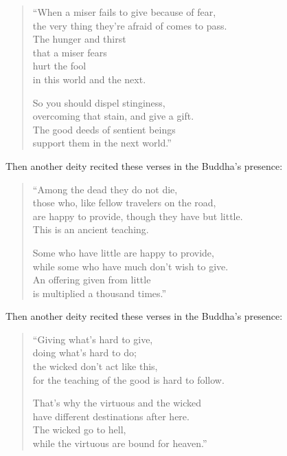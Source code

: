 \documentclass[12pt,openany]{book}%
\begin{document}
\begin{verse}%
“When a miser fails to give because of fear, \\
the very thing they’re afraid of comes to pass. \\
The hunger and thirst \\
that a miser fears \\
hurt the fool \\
in this world and the next. 

So you should dispel stinginess, \\
overcoming that stain, and give a gift. \\
The good deeds of sentient beings \\
support them in the next world.” 

%
\end{verse}

Then another deity recited these verses in the Buddha’s presence: 

\begin{verse}%
“Among the dead they do not die, \\
those who, like fellow travelers on the road, \\
are happy to provide, though they have but little. \\
This is an ancient teaching. 

Some who have little are happy to provide, \\
while some who have much don’t wish to give. \\
An offering given from little \\
is multiplied a thousand times.” 

%
\end{verse}

Then another deity recited these verses in the Buddha’s presence: 

\begin{verse}%
“Giving what’s hard to give, \\
doing what’s hard to do; \\
the wicked don’t act like this, \\
for the teaching of the good is hard to follow. 

That’s why the virtuous and the wicked \\
have different destinations after here. \\
The wicked go to hell, \\
while the virtuous are bound for heaven.” 

%
\end{verse}
\end{document}
